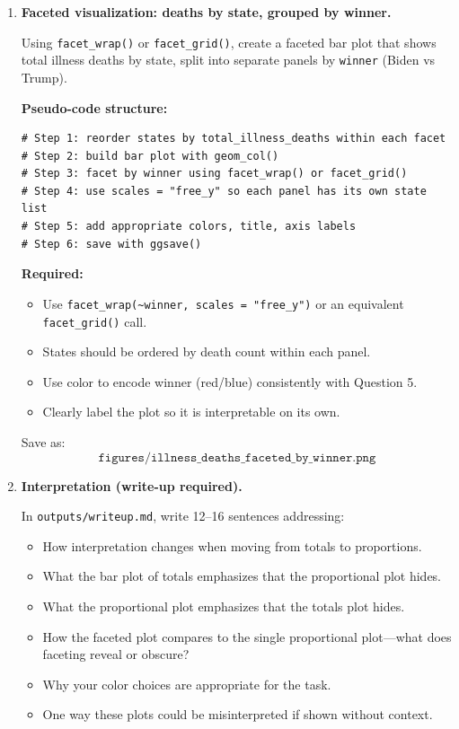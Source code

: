 \documentclass[11pt]{article}
\begin{document}
\begin{enumerate}
  \item \textbf{Faceted visualization: deaths by state, grouped by winner.}

  Using \texttt{facet\_wrap()} or \texttt{facet\_grid()}, create a faceted bar plot that shows total illness deaths by state, split into separate panels by \texttt{winner} (Biden vs Trump).

  \medskip
  \noindent \textbf{Pseudo-code structure:}
\begin{verbatim}
# Step 1: reorder states by total_illness_deaths within each facet
# Step 2: build bar plot with geom_col()
# Step 3: facet by winner using facet_wrap() or facet_grid()
# Step 4: use scales = "free_y" so each panel has its own state list
# Step 5: add appropriate colors, title, axis labels
# Step 6: save with ggsave()
\end{verbatim}

  \noindent \textbf{Required:}
  \begin{itemize}
    \item Use \texttt{facet\_wrap(\textasciitilde winner, scales = "free\_y")} or an equivalent \texttt{facet\_grid()} call.
    \item States should be ordered by death count within each panel.
    \item Use color to encode winner (red/blue) consistently with Question 5.
    \item Clearly label the plot so it is interpretable on its own.
  \end{itemize}

  \noindent Save as:
  \[
    \texttt{figures/illness\_deaths\_faceted\_by\_winner.png}
  \]

  \item \textbf{Interpretation (write-up required).}

  In \texttt{outputs/writeup.md}, write 12--16 sentences addressing:
  \begin{itemize}
    \item How interpretation changes when moving from totals to proportions.
    \item What the bar plot of totals emphasizes that the proportional plot hides.
    \item What the proportional plot emphasizes that the totals plot hides.
    \item How the faceted plot compares to the single proportional plot---what does faceting reveal or obscure?
    \item Why your color choices are appropriate for the task.
    \item One way these plots could be misinterpreted if shown without context.
  \end{itemize}


\end{enumerate}
\end{document}
